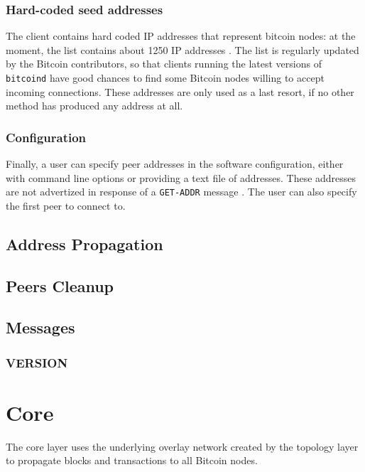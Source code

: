 \subsubsection{Hard-coded seed addresses}
The client contains hard coded IP addresses that represent bitcoin nodes:
at the moment, the list contains about \num{1250} IP addresses \cite{bitcoin_seeds}.
The list is regularly updated by the Bitcoin contributors, so that clients running the latest versions of \texttt{bitcoind} have good chances to find some Bitcoin nodes willing to accept incoming connections.
These addresses are only used as a last resort, if no other method has produced any address at all.

\subsubsection{Configuration}
Finally, a user can specify peer addresses in the software configuration, either with command line options or providing a text file of addresses.
These addresses are not advertized in response of a \texttt{GET-ADDR} message \cite{bitcoin_peer_discovery}.
The user can also specify the first peer to connect to.

\subsection{Address Propagation}

\subsection{Peers Cleanup}

\subsection{Messages}

\subsubsection{VERSION}
\label{par:version}

\section{Core}
The core layer uses the underlying overlay network created by the topology layer to propagate blocks and transactions to all Bitcoin nodes.

